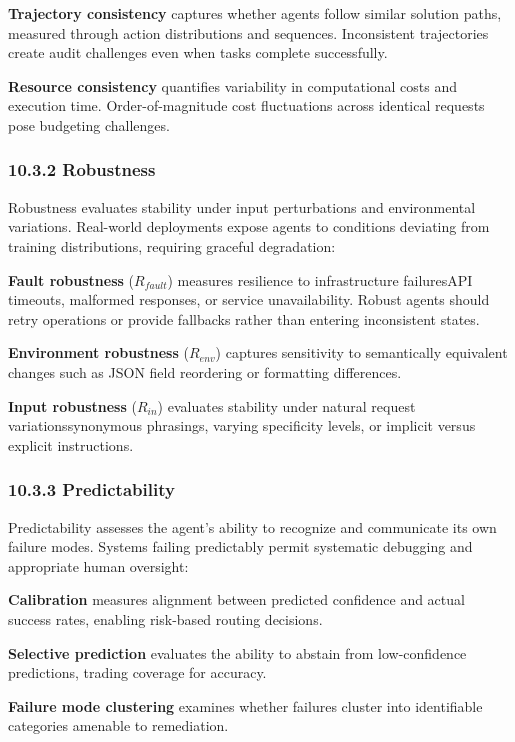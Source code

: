 \textbf{Trajectory consistency} captures whether agents follow similar solution paths, measured through action distributions and sequences. Inconsistent trajectories create audit challenges even when tasks complete successfully.

\textbf{Resource consistency} quantifies variability in computational costs and execution time. Order-of-magnitude cost fluctuations across identical requests pose budgeting challenges.

\subsubsection{10.3.2 Robustness}

Robustness evaluates stability under input perturbations and environmental variations. Real-world deployments expose agents to conditions deviating from training distributions, requiring graceful degradation:

\textbf{Fault robustness} ($R_{fault}$) measures resilience to infrastructure failuresAPI timeouts, malformed responses, or service unavailability. Robust agents should retry operations or provide fallbacks rather than entering inconsistent states.

\textbf{Environment robustness} ($R_{env}$) captures sensitivity to semantically equivalent changes such as JSON field reordering or formatting differences.

\textbf{Input robustness} ($R_{in}$) evaluates stability under natural request variationssynonymous phrasings, varying specificity levels, or implicit versus explicit instructions.

\subsubsection{10.3.3 Predictability}

Predictability assesses the agent's ability to recognize and communicate its own failure modes. Systems failing predictably permit systematic debugging and appropriate human oversight:

\textbf{Calibration} measures alignment between predicted confidence and actual success rates, enabling risk-based routing decisions.

\textbf{Selective prediction} evaluates the ability to abstain from low-confidence predictions, trading coverage for accuracy.

\textbf{Failure mode clustering} examines whether failures cluster into identifiable categories amenable to remediation.

